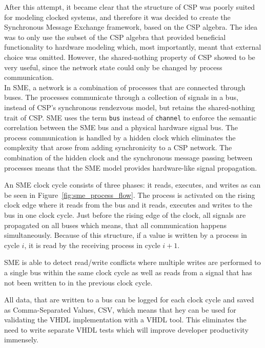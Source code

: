 After this attempt, it became clear that the structure of CSP was poorly suited for modeling clocked systems, and therefore it was decided to create the Synchronous Message Exchange framework, based on the CSP algebra. The idea was to only use the subset of the CSP algebra that provided beneficial functionality to hardware modeling which, most importantly, meant that external choice was omitted. However, the shared-nothing property of CSP showed to be very useful, since the network state could only be changed by process communication.
\\

In SME, a network is a combination of processes that are connected through buses. The processes communicate through a collection of signals in a bus, instead of CSP's synchronous rendezvous model, but retains the shared-nothing trait of CSP.
SME uses the term \texttt{bus} instead of \texttt{channel} to enforce the semantic correlation between the SME bus and a physical hardware signal bus.
The process communication is handled by a hidden clock which eliminates the complexity that arose from adding synchronicity to a CSP network. The combination of the hidden clock and the synchronous message passing between processes means that the SME model provides hardware-like signal propagation.

An SME clock cycle consists of three phases: it reads, executes, and writes as can be seen in Figure~\ref{fig:sme_process_flow}. The process is activated on the rising clock edge where it reads from the bus and it reads, executes and writes to the bus in one clock cycle. Just before the rising edge of the clock, all signals are propagated on all buses which means, that all communication happens simultaneously. Because of this structure, if a value is written by a process in cycle $i$, it is read by the receiving process in cycle $i+1$.

SME is able to detect read/write conflicts where multiple writes are performed to a single bus within the same clock cycle as well as reads from a signal that has not been written to in the previous clock cycle.

All data, that are written to a bus can be logged for each clock cycle and saved as Comma-Separated Values, CSV, which means that hey can be used for validating the VHDL implementation with a VHDL tool. This eliminates the need to write separate VHDL tests which will improve developer productivity immensely.

